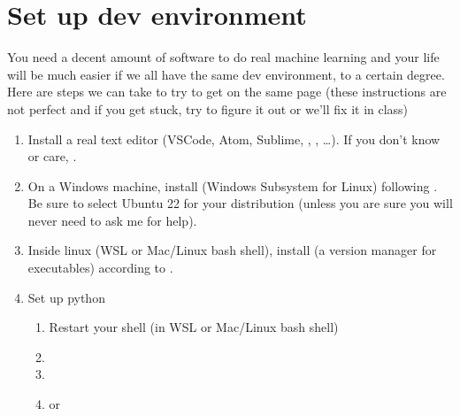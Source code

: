 \documentclass[letterpaper,10pt,english]{jupyterBook}
\begin{document}
\section{Set up dev environment}
\label{\detokenize{lessons/hw01:set-up-dev-environment}}
\sphinxAtStartPar
You need a decent amount of software to do real machine learning and your life will be much
easier if we all have the same dev environment, to a certain degree. Here are steps we can take to try to get on the same page (these instructions are not perfect and if you get stuck, try to figure it out or we’ll fix it in class)
\begin{enumerate}
%
\item {} 
\sphinxAtStartPar
Install a real text editor (VSCode, Atom, Sublime, , , …). If you don’t know or care, .

\item {} 
\sphinxAtStartPar
On a Windows machine, install  (Windows Subsystem for Linux) following . Be sure to select Ubuntu 22 for your distribution (unless you are sure you will never need to ask me for help).

\item {} 
\sphinxAtStartPar
Inside linux (WSL or Mac/Linux bash shell), install  (a version manager for executables) according to .

\item {} 
\sphinxAtStartPar
Set up python
\begin{enumerate}
%
\item {} 
\sphinxAtStartPar
Restart your shell (in WSL or Mac/Linux bash shell)

\item {} 
\sphinxAtStartPar
{}

\item {} 
\sphinxAtStartPar
{}

\item {} 
\sphinxAtStartPar
{} or 


\end{enumerate}
\end{enumerate}
\end{document}
